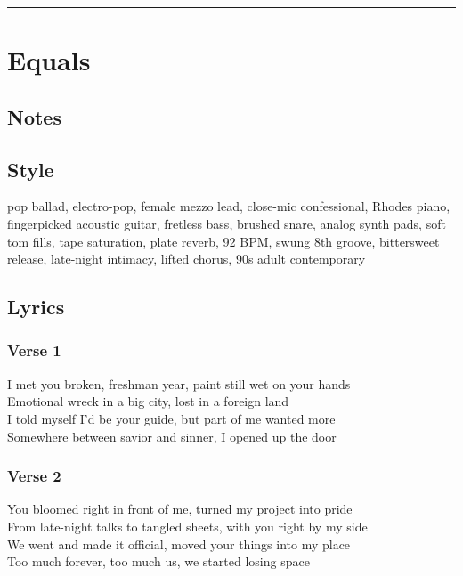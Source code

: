 \begin{center}\rule{0.5\linewidth}{0.5pt}\end{center}

\section{Equals}\label{equals}

\subsection{Notes}\label{notes-29}

\subsection{Style}\label{style-28}

pop ballad, electro-pop, female mezzo lead, close-mic confessional,
Rhodes piano, fingerpicked acoustic guitar, fretless bass, brushed
snare, analog synth pads, soft tom fills, tape saturation, plate reverb,
92 BPM, swung 8th groove, bittersweet release, late-night intimacy,
lifted chorus, 90s adult contemporary

\subsection{Lyrics}\label{lyrics-28}

\subsubsection{Verse 1}\label{verse-1-22}

I met you broken, freshman year, paint still wet on your hands\\
Emotional wreck in a big city, lost in a foreign land\\
I told myself I'd be your guide, but part of me wanted more\\
Somewhere between savior and sinner, I opened up the door

\subsubsection{Verse 2}\label{verse-2-21}

You bloomed right in front of me, turned my project into pride\\
From late-night talks to tangled sheets, with you right by my side\\
We went and made it official, moved your things into my place\\
Too much forever, too much us, we started losing space

